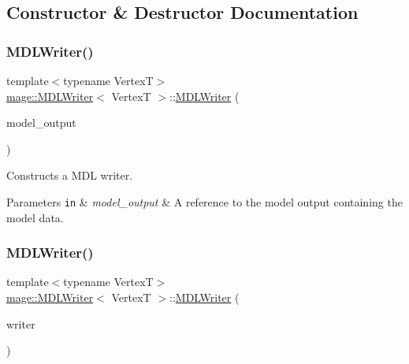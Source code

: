 \subsection{Constructor \& Destructor Documentation}
\hypertarget{classmage_1_1_m_d_l_writer_a7e5c6c9c9a9d32b09c5e17f4691e01c1}{}\label{classmage_1_1_m_d_l_writer_a7e5c6c9c9a9d32b09c5e17f4691e01c1} 
\subsubsection{\texorpdfstring{M\+D\+L\+Writer()}{MDLWriter()}\hspace{0.1cm}{\footnotesize\ttfamily [1/3]}}
{\footnotesize\ttfamily template$<$typename VertexT$>$ \\
\hyperlink{classmage_1_1_m_d_l_writer}{mage\+::\+M\+D\+L\+Writer}$<$ VertexT $>$\+::\hyperlink{classmage_1_1_m_d_l_writer}{M\+D\+L\+Writer} (\begin{DoxyParamCaption}\item[{const \hyperlink{structmage_1_1_model_output}{Model\+Output}$<$ VertexT $>$ \&}]{model\+\_\+output }\end{DoxyParamCaption})\hspace{0.3cm}{\ttfamily [explicit]}}

Constructs a M\+DL writer.


\begin{DoxyParams}[1]{Parameters}
\mbox{\tt in}  & {\em model\+\_\+output} & A reference to the model output containing the model data. \\
\hline
\end{DoxyParams}
\hypertarget{classmage_1_1_m_d_l_writer_ada4bed9d0ad947fd7039cdf9d8cc9698}{}\label{classmage_1_1_m_d_l_writer_ada4bed9d0ad947fd7039cdf9d8cc9698} 
\subsubsection{\texorpdfstring{M\+D\+L\+Writer()}{MDLWriter()}\hspace{0.1cm}{\footnotesize\ttfamily [2/3]}}
{\footnotesize\ttfamily template$<$typename VertexT$>$ \\
\hyperlink{classmage_1_1_m_d_l_writer}{mage\+::\+M\+D\+L\+Writer}$<$ VertexT $>$\+::\hyperlink{classmage_1_1_m_d_l_writer}{M\+D\+L\+Writer} (\begin{DoxyParamCaption}\item[{const \hyperlink{classmage_1_1_m_d_l_writer}{M\+D\+L\+Writer}$<$ VertexT $>$ \&}]{writer }\end{DoxyParamCaption})\hspace{0.3cm}{\ttfamily [delete]}}

